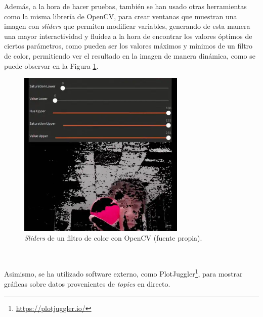 Además, a la hora de hacer pruebas, también se han usado otras herramientas como
la misma librería de OpenCV, para crear ventanas que muestran una imagen con
\textit{sliders} que permiten modificar variables, generando de esta manera una
mayor interactividad y fluidez a la hora de encontrar los valores óptimos de
ciertos parámetros, como pueden ser los valores máximos y mínimos de un filtro
de color, permitiendo ver el resultado en la imagen de manera dinámica, como se
puede observar en la Figura \ref{fig:opencv}.

\begin{figure} [h!]
  \begin{center}
    \includegraphics[width=8cm]{figs/opencv_visualization}
  \end{center}
  \caption{\textit{Sliders} de un filtro de color con OpenCV (fuente propia).}
  \label{fig:opencv}
\end{figure}\

Asimismo, se ha utilizado software externo, como
PlotJuggler\footnote{\url{https://plotjuggler.io/}}, para mostrar gráficas sobre
datos provenientes de \textit{topics} en directo.


